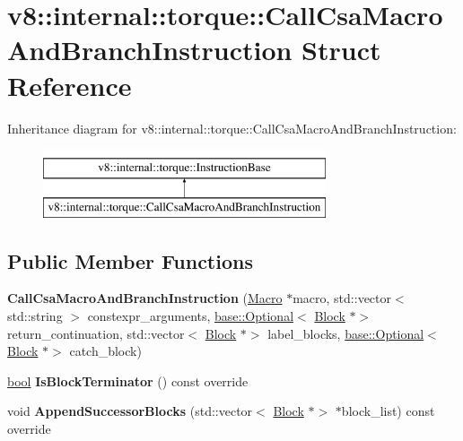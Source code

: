 \hypertarget{structv8_1_1internal_1_1torque_1_1CallCsaMacroAndBranchInstruction}{}\section{v8\+:\+:internal\+:\+:torque\+:\+:Call\+Csa\+Macro\+And\+Branch\+Instruction Struct Reference}
\label{structv8_1_1internal_1_1torque_1_1CallCsaMacroAndBranchInstruction}
Inheritance diagram for v8\+:\+:internal\+:\+:torque\+:\+:Call\+Csa\+Macro\+And\+Branch\+Instruction\+:\begin{figure}[H]
\begin{center}
\leavevmode
\includegraphics[height=2.000000cm]{structv8_1_1internal_1_1torque_1_1CallCsaMacroAndBranchInstruction}
\end{center}
\end{figure}
\subsection*{Public Member Functions}
\begin{DoxyCompactItemize}
\item 
\mbox{\label{structv8_1_1internal_1_1torque_1_1CallCsaMacroAndBranchInstruction_a63a8b4e1c918620bfc2eff5df4efae18}} 
{\bfseries Call\+Csa\+Macro\+And\+Branch\+Instruction} (\mbox{\hyperlink{classv8_1_1internal_1_1torque_1_1Macro}{Macro}} $\ast$macro, std\+::vector$<$ std\+::string $>$ constexpr\+\_\+arguments, \mbox{\hyperlink{classv8_1_1base_1_1Optional}{base\+::\+Optional}}$<$ \mbox{\hyperlink{classv8_1_1internal_1_1torque_1_1Block}{Block}} $\ast$$>$ return\+\_\+continuation, std\+::vector$<$ \mbox{\hyperlink{classv8_1_1internal_1_1torque_1_1Block}{Block}} $\ast$$>$ label\+\_\+blocks, \mbox{\hyperlink{classv8_1_1base_1_1Optional}{base\+::\+Optional}}$<$ \mbox{\hyperlink{classv8_1_1internal_1_1torque_1_1Block}{Block}} $\ast$$>$ catch\+\_\+block)
\item 
\mbox{\label{structv8_1_1internal_1_1torque_1_1CallCsaMacroAndBranchInstruction_ac41c6306473fbb2f0f5bef51f0c0128f}} 
\mbox{\hyperlink{classbool}{bool}} {\bfseries Is\+Block\+Terminator} () const override
\item 
\mbox{\label{structv8_1_1internal_1_1torque_1_1CallCsaMacroAndBranchInstruction_acc016c5f0605387c30cc0a6b96104119}} 
void {\bfseries Append\+Successor\+Blocks} (std\+::vector$<$ \mbox{\hyperlink{classv8_1_1internal_1_1torque_1_1Block}{Block}} $\ast$$>$ $\ast$block\+\_\+list) const override
\end{DoxyCompactItemize}
